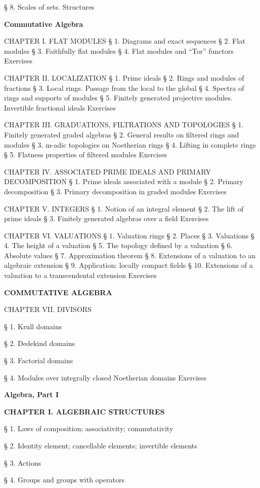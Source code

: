 § 8. Scales of sets. Structures

\textbf{Commutative Algebra}

CHAPTER I. FLAT MODULES § 1. Diagrams and exact sequences § 2. Flat modules § 3. Faithfully flat modules § 4. Flat modules and ``Tor'' functors Exercises

CHAPTER II. LOCALIZATION § 1. Prime ideals § 2. Rings and modules of fractions § 3. Local rings. Passage from the local to the global § 4. Spectra of rings and supports of modules § 5. Finitely generated projective modules. Invertible fractional ideals Exercises

CHAPTER III. GRADUATIONS, FILTRATIONS AND TOPOLOGIES § 1. Finitely generated graded algebras § 2. General results on filtered rings and modules § 3. m-adic topologies on Noetherian rings § 4. Lifting in complete rings § 5. Flatness properties of filtered modules Exercises

CHAPTER IV. ASSOCIATED PRIME IDEALS AND PRIMARY DECOMPOSITION § 1. Prime ideals associated with a module § 2. Primary decomposition § 3. Primary decomposition in graded modules Exercises

CHAPTER V. INTEGERS § 1. Notion of an integral element § 2. The lift of prime ideals § 3. Finitely generated algebras over a field Exercises

CHAPTER VI. VALUATIONS § 1. Valuation rings § 2. Places § 3. Valuations § 4. The height of a valuation § 5. The topology defined by a valuation § 6. Absolute values § 7. Approximation theorem § 8. Extensions of a valuation to an algebraic extension § 9. Application: locally compact fields § 10. Extensions of a valuation to a transcendental extension Exercises

\textbf{COMMUTATIVE ALGEBRA}

CHAPTER VII. DIVISORS

§ 1. Krull domains

§ 2. Dedekind domains

§ 3. Factorial domains

§ 4. Modules over integrally closed Noetherian domains Exercises

\textbf{Algebra, Part I}

\textbf{CHAPTER I. ALGEBRAIC STRUCTURES}

§ 1. Laws of composition; associativity; commutativity

§ 2. Identity element; cancellable elements; invertible elements

§ 3. Actions

§ 4. Groups and groups with operators

